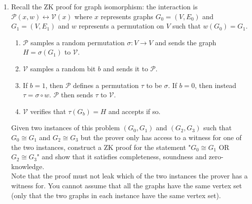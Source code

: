\documentclass[11pt]{article}
\numberwithin{equation}{section}
\begin{document}
\begin{enumerate}
    Let $G: \{0,1\}^n \to \{0,1\}^{3n}$ be a secure PRG. To commit to a bit $b \in \{0, 1\}$, Alice and Bob engage in the following protocol:
    
    \begin{itemize}
        \item \textbf{Commit}: Bob commits to bit $b \in \{0, 1\}$ by doing the following:
        \begin{enumerate}
            \item Alice chooses a random $r \in \{0,1\}^{3n}$ and sends $r$ to Bob.
            \item Bob chooses a random $s \in \{0,1\}^n$ and computes:
            \[ c = \text{com}(s, r, b) := \begin{cases} G(s) & \text{if } b=0, \\ G(s) \oplus r & \text{if } b=1. \end{cases} \]
            Bob outputs $c$ as the commitment string and uses $s$ as the opening string.
        \end{enumerate}
        \item \textbf{Open}: Bob sends $(b, s)$ to Alice. Alice accepts the opening if $c = \text{com}(s, r, b)$ and rejects otherwise.
    \end{itemize}


    \item Recall the ZK proof for graph isomorphism: the interaction is $\mathcal{P}(x, w) \leftrightarrow \mathcal{V}(x)$ where $x$ represents graphs $G_0 = (V, E_0)$ and $G_1 = (V, E_1)$ and $w$ represents a permutation on $V$ such that $w(G_0) = G_1$.
    \begin{enumerate}
        \item $\mathcal{P}$ samples a random permutation $\sigma : V \to V$ and sends the graph $H = \sigma(G_1)$ to $\mathcal{V}$.
        \item $\mathcal{V}$ samples a random bit $b$ and sends it to $\mathcal{P}$.
        \item If $b = 1$, then $\mathcal{P}$ defines a permutation $\tau$ to be $\sigma$. If $b = 0$, then instead $\tau = \sigma \circ w$. $\mathcal{P}$ then sends $\tau$ to $\mathcal{V}$.
        \item $\mathcal{V}$ verifies that $\tau(G_b) = H$ and accepts if so.
    \end{enumerate}

    Given two instances of this problem $(G_0,G_1)$ and $(G_2, G_3)$ such that $G_0 \cong G_1$ and $G_2 \cong G_3$ but the prover only has access to a witness for one of the two instances, construct a ZK proof for the statement "$G_0 \cong G_1$ OR $G_2 \cong G_3$" and show that it satisfies completeness, soundness and zero-knowledge. \\
    Note that the proof must not leak which of the two instances the prover has a witness for. You cannot assume that all the graphs have the same vertex set (only that the two graphs in each instance have the same vertex set).



\end{enumerate}
\end{document}
